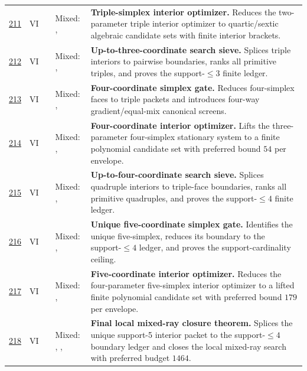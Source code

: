 {\begin{longtable}{@{}L{0.055\textwidth}L{0.075\textwidth}L{0.145\textwidth}L{0.235\textwidth}L{0.43\textwidth}@{}}
\addlinespace
\hyperref[stage:211]{211} & VI &  & Mixed: \StatusExactClosure{}, \StatusNumerical{} & \textbf{Triple-simplex interior optimizer.} Reduces the two-parameter triple interior optimizer to quartic/sextic algebraic candidate sets with finite interior brackets. \\
\addlinespace
\hyperref[stage:212]{212} & VI &  & Mixed: \StatusExactClosure{}, \StatusNumerical{} & \textbf{Up-to-three-coordinate search sieve.} Splices triple interiors to pairwise boundaries, ranks all primitive triples, and proves the support-\(\le3\) finite ledger. \\
\addlinespace
\hyperref[stage:213]{213} & VI &  & Mixed: \StatusExactClosure{}, \StatusNumerical{} & \textbf{Four-coordinate simplex gate.} Reduces four-simplex faces to triple packets and introduces four-way gradient/equal-mix canonical screens. \\
\addlinespace
\hyperref[stage:214]{214} & VI &  & Mixed: \StatusExactClosure{}, \StatusNumerical{} & \textbf{Four-coordinate interior optimizer.} Lifts the three-parameter four-simplex stationary system to a finite polynomial candidate set with preferred bound \(54\) per envelope. \\
\addlinespace
\hyperref[stage:215]{215} & VI &  & Mixed: \StatusExactClosure{}, \StatusNumerical{} & \textbf{Up-to-four-coordinate search sieve.} Splices quadruple interiors to triple-face boundaries, ranks all primitive quadruples, and proves the support-\(\le4\) finite ledger. \\
\addlinespace
\hyperref[stage:216]{216} & VI &  & Mixed: \StatusExactClosure{}, \StatusNumerical{} & \textbf{Unique five-coordinate simplex gate.} Identifies the unique five-simplex, reduces its boundary to the support-\(\le4\) ledger, and proves the support-cardinality ceiling. \\
\addlinespace
\hyperref[stage:217]{217} & VI &  & Mixed: \StatusExactClosure{}, \StatusNumerical{} & \textbf{Five-coordinate interior optimizer.} Reduces the four-parameter five-simplex interior optimizer to a lifted finite polynomial candidate set with preferred bound \(179\) per envelope. \\
\addlinespace
\hyperref[stage:218]{218} & VI &  & Mixed: \StatusExactClosure{}, \StatusNumerical{}, \StatusOpen{} & \textbf{Final local mixed-ray closure theorem.} Splices the unique support-5 interior packet to the support-\(\le4\) boundary ledger and closes the local mixed-ray search with preferred budget \(1464\). \\

\end{longtable}}
